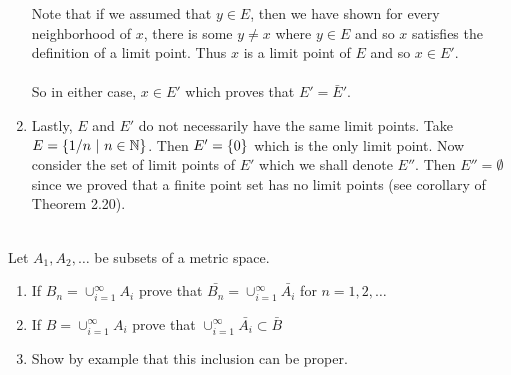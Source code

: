 \documentclass[12pt]{article}
\begin{document}
\begin{enumerate}
Note that if we assumed that $y \in E$, then we have shown for every neighborhood of $x$, there is some $y \neq x$ where $y \in E$ and so $x$ satisfies the definition of a limit point. Thus $x$ is a limit point of $E$ and so $x \in E'$.  \\ \\
So in either case, $x \in E'$ which proves that $E'=\bar{E}'$. \\ 

\item Lastly, $E$ and $E'$ do not necessarily have the same limit points. Take $E= \left\{1/n~|~n \in \mathbb{N}\right\}$. Then $E'=\left\{0\right\}$ which is the only limit point. Now consider the set of limit points of $E'$ which we shall denote $E''$. Then $E''= \emptyset$ since we proved that a finite point set has no limit points (see corollary of Theorem 2.20). \\ \\
\end{enumerate}


\problem Let $A_{1}, A_{2}, \ldots $ be subsets of a metric space.
\begin{enumerate}
\item If $B_{n}= \cup^{\infty}_{i=1} A_{i}$ prove that $\bar{B_{n}}=\cup^{\infty}_{i=1} \bar{A_{i}}$ for $n=1,2, \ldots$
\item If $B = \cup^{\infty }_{i=1}A_{i}$ prove that $\cup^{\infty }_{i=1} \bar{A_{i}} \subset \bar{B}$ 
\item Show by example that this inclusion can be proper. 
\end{enumerate}
\end{document}

